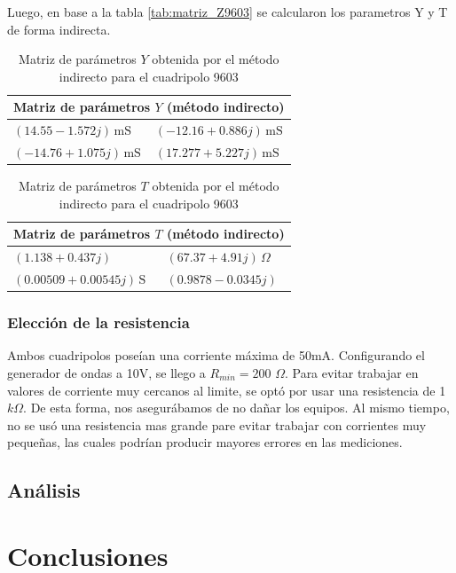 \documentclass{article}
\begin{document}
Luego, en base a la tabla \ref{tab:matriz_Z9603} se calcularon los parametros Y y T de forma indirecta.

\begin{table}[H]
\centering
\begin{tabular}{|l|l|}
\hline
\multicolumn{2}{|c|}{\textbf{Matriz de parámetros $Y$ (método indirecto)}} \\ \hline
$(14.55 - 1.572j)\,\mathrm{mS}$ & $(-12.16 + 0.886j)\,\mathrm{mS}$ \\ \hline
$(-14.76 + 1.075j)\,\mathrm{mS}$ & $(17.277 + 5.227j)\,\mathrm{mS}$ \\ \hline
\end{tabular}
\caption{Matriz de parámetros $Y$ obtenida por el método indirecto para el cuadripolo 9603}
\label{tab:matriz_Y9603_indirecta}
\end{table}

\begin{table}[H]
\centering
\begin{tabular}{|l|l|}
\hline
\multicolumn{2}{|c|}{\textbf{Matriz de parámetros $T$ (método indirecto)}} \\ \hline
$(1.138 + 0.437j)$ & $(67.37 + 4.91j)\,\Omega$ \\ \hline
$(0.00509 + 0.00545j)\,\mathrm{S}$ & $(0.9878 - 0.0345j)$ \\ \hline
\end{tabular}
\caption{Matriz de parámetros $T$ obtenida por el método indirecto para el cuadripolo 9603}
\label{tab:matriz_T9603_indirecta}
\end{table}






	
	\subsubsection*{Elección de la resistencia}
	
	Ambos cuadripolos poseían una corriente máxima de 50mA. Configurando el generador de ondas a 10V, se llego a $R_{min} = 200$ $ \Omega$. Para evitar trabajar en valores de corriente muy cercanos al limite, se optó por usar una resistencia de 1 $k\Omega$. De esta forma, nos asegurábamos de no dañar los equipos. Al mismo tiempo, no se usó una resistencia mas grande pare evitar trabajar con corrientes muy pequeñas, las cuales podrían producir mayores errores en las mediciones.
	
	


        


    \subsection{Análisis}
    



\section{Conclusiones}

	
\end{document}
